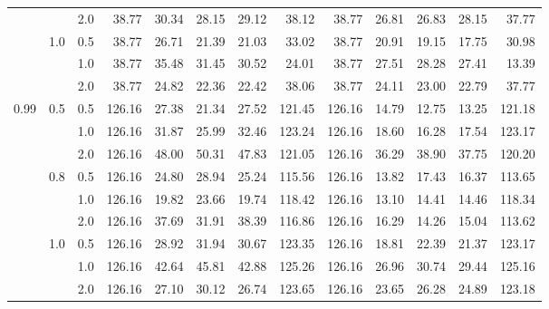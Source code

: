 \documentclass{article}
\begin{document}
{\begin{tabular}{lllrrrrrrrrrr}
          &     & 2.0 &   38.77 &       30.34 &                 28.15 &                    29.12 &          38.12 &   38.77 &       26.81 &                 26.83 &                    28.15 &          37.77 \\
          & 1.0 & 0.5 &   38.77 &       26.71 &                 21.39 &                    21.03 &          33.02 &   38.77 &       20.91 &                 19.15 &                    17.75 &          30.98 \\
          &     & 1.0 &   38.77 &       35.48 &                 31.45 &                    30.52 &          24.01 &   38.77 &       27.51 &                 28.28 &                    27.41 &          13.39 \\
          &     & 2.0 &   38.77 &       24.82 &                 22.36 &                    22.42 &          38.06 &   38.77 &       24.11 &                 23.00 &                    22.79 &          37.77 \\
     0.99 & 0.5 & 0.5 &  126.16 &       27.38 &                 21.34 &                    27.52 &         121.45 &  126.16 &       14.79 &                 12.75 &                    13.25 &         121.18 \\
          &     & 1.0 &  126.16 &       31.87 &                 25.99 &                    32.46 &         123.24 &  126.16 &       18.60 &                 16.28 &                    17.54 &         123.17 \\
          &     & 2.0 &  126.16 &       48.00 &                 50.31 &                    47.83 &         121.05 &  126.16 &       36.29 &                 38.90 &                    37.75 &         120.20 \\
          & 0.8 & 0.5 &  126.16 &       24.80 &                 28.94 &                    25.24 &         115.56 &  126.16 &       13.82 &                 17.43 &                    16.37 &         113.65 \\
          &     & 1.0 &  126.16 &       19.82 &                 23.66 &                    19.74 &         118.42 &  126.16 &       13.10 &                 14.41 &                    14.46 &         118.34 \\
          &     & 2.0 &  126.16 &       37.69 &                 31.91 &                    38.39 &         116.86 &  126.16 &       16.29 &                 14.26 &                    15.04 &         113.62 \\
          & 1.0 & 0.5 &  126.16 &       28.92 &                 31.94 &                    30.67 &         123.35 &  126.16 &       18.81 &                 22.39 &                    21.37 &         123.17 \\
          &     & 1.0 &  126.16 &       42.64 &                 45.81 &                    42.88 &         125.26 &  126.16 &       26.96 &                 30.74 &                    29.44 &         125.16 \\
          &     & 2.0 &  126.16 &       27.10 &                 30.12 &                    26.74 &         123.65 &  126.16 &       23.65 &                 26.28 &                    24.89 &         123.18 \\
     \bottomrule
     \end{tabular}
}  
\end{document}
